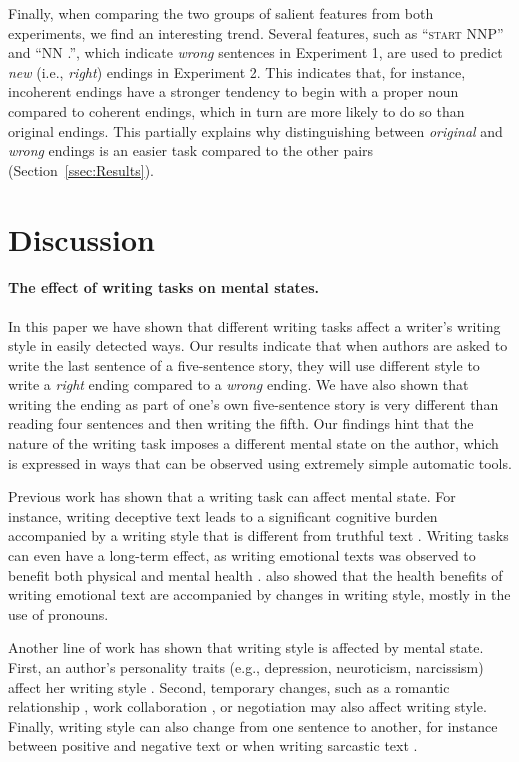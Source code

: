 \documentclass[11pt,a4paper]{article}
\newcommand{\secref}[1]{Section~\ref{ssec:#1}}
\newcommand{\isectionb}[1]{\section{#1}\label{ssec:#1}}
\begin{document}
Finally, when comparing the two groups of salient features from both experiments, we find an interesting trend.
Several features, such as ``\textsc{start} NNP'' and  ``NN .'', which indicate {\it wrong} sentences in Experiment 1, are used to predict {\it new} (i.e., {\it right}) endings in Experiment 2. 
This indicates that, for instance, incoherent endings have a stronger tendency to begin with a proper noun compared to coherent endings, 
which in turn are more likely to do so than original endings. 
This partially explains why distinguishing between {\it original} and {\it wrong} endings is an easier task compared to the other pairs (\secref{Results}).


\isectionb{Discussion}

\paragraph{The effect of writing tasks on mental states.}
In this paper we have shown that different writing tasks affect a writer's writing style in easily detected ways.
Our results indicate that when authors are asked to write the last
sentence of a five-sentence story, they will use different style to
write a {\it right} ending compared to a {\it wrong} ending. We have
also shown that writing the ending as part of one's own five-sentence story is very different than reading four sentences and then writing the fifth.
Our findings hint that the nature of the writing task imposes a
different mental state on the author, which is expressed in ways that can be observed using extremely simple automatic tools. 

Previous work has shown that a writing task can affect mental state.
For instance, writing deceptive text leads to a significant cognitive
burden accompanied by a writing style that is different from truthful
text \cite{Newman:2003,Banerjee:2014}.
Writing tasks can even have a long-term effect,
as writing emotional texts was observed to benefit both physical and mental health \cite{Lepore:2002,Frattaroli:2006}. 
\citet{Campbell:2003} also showed that the health benefits of writing emotional text are accompanied by changes in writing style, mostly in the use of pronouns.

Another line of work has shown that writing style is affected by mental state.
First, an author's personality traits (e.g., depression, neuroticism, narcissism) affect her writing style \cite{schwartz2013personality,Ireland:2014b}.
Second, temporary changes, such as a romantic relationship \cite{Ireland:2011,Bowen:2016}, work collaboration \cite{Tausczik:2009,Gonzales:2009}, or negotiation \cite{Ireland:2014} may also affect writing style.
Finally, writing style can also change from one sentence to another, for instance between positive and negative text \cite{Davidov:2010} or when writing sarcastic text \cite{Tsur:2010}. 
\end{document}
